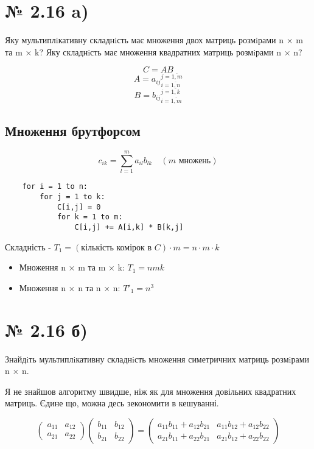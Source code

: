 \documentclass[11pt, a4paper]{article} %
\begin{document}

\section*{№ 2.16 a)}
\begin{mdframed}
    Яку мультиплiкативну складнiсть має множення двох матриць розмiрами
n × m та m × k? Яку складнiсть має множення квадратних матриць розмiрами n × n?
\end{mdframed}

$$C = AB$$
$$A = {a_{ij}}_{i=\overline{1,n}}^{j=\overline{1,m}}$$
$$B = {b_{ij}}_{i=\overline{1,m}}^{j=\overline{1,k}}$$

\subsection*{Множення брутфорсом}
$$c_{ik} = \sum_{l=1}^m a_{il}b_{lk} \quad (m\text{ множень})$$

\begin{lstlisting}
    for i = 1 to n:
        for j = 1 to k:
            C[i,j] = 0 
            for k = 1 to m:
                C[i,j] += A[i,k] * B[k,j]
\end{lstlisting}

Складність - $T_1 = (\text{кількість комірок в }C)\cdot m = n\cdot m \cdot k$
\begin{mdframed}[style=ans]
    \begin{itemize}
        \item Множення n × m та m × k: $T_1 = nmk$
        \item Множення n × n та n × n: $T'_1 = n^3$
    \end{itemize}
\end{mdframed}

\section*{№ 2.16 б)}
\begin{mdframed}
    Знайдiть мультиплiкативну складнiсть множення симетричних матриць розмiрами
n × n.
\end{mdframed}

Я не знайшов алгоритму швидше, ніж як для множення довільних квадратних матриць.
Єдине що, можна десь зекономити в кешуванні.

$$\begin{pmatrix}
    a_{11} & a_{12} \\ a_{21} & a_{22}
\end{pmatrix}\begin{pmatrix}
    b_{11} & b_{12} \\ b_{21} & b_{22}
\end{pmatrix} = \begin{pmatrix}
    a_{11}b_{11}+\boxed{a_{12}b_{21}} & a_{11}b_{12} + {a_{12}b_{22}}\\
    a_{21}b_{11}+{a_{22}b_{21}} & \boxed{a_{21}b_{12}} + a_{22}b_{22}
\end{pmatrix}$$
\end{document}
